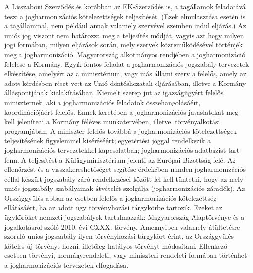 A Lisszaboni Szerződés és korábban az EK-Szerződés is, a tagállamok feladatává teszi a jogharmonizációs kötelezettségek teljesítését. (Ezek elmulasztása esetén is a tagállammal, nem például annak valamely szervével szemben indul eljárás.) Az uniós jog viszont nem határozza meg a teljesítés módját, vagyis azt hogy milyen jogi formában, milyen eljárások során, mely szervek közreműködésével történjék meg a jogharmonizáció. Magyarország alkotmányos rendjében a jogharmonizáció felelőse a Kormány. Egyik fontos feladat a jogharmonizációs jogszabály-tervezetek elkészítése, amelyért az a minisztérium, vagy más állami szerv a felelős, amely az adott kérdésben részt vett az Unió döntéshozatali eljárásában, illetve a Kormány álláspontjának kialakításában. Kiemelt szerep jut az igazságügyért felelős miniszternek, aki a jogharmonizációs feladatok összehangolásáért, koordinációjáért felelős. Ennek keretében a jogharmonizációs javaslatokat meg kell jeleníteni a Kormány féléves munkatervében, illetve. törvényalkotási programjában. A miniszter felelős továbbá a jogharmonizációs kötelezettségek teljesítésének figyelemmel kíséréséért; egyetértési joggal rendelkezik a jogharmonizációs tervezetekkel kapcsolatban; jogharmonizációs adatbázist tart fenn. A teljesítést a Külügyminisztérium jelenti az Európai Bizottság felé. Az ellenőrzést és a visszakereshetőséget segítése érdekében minden jogharmonizációs céllal készült jogszabály záró rendelkezései között fel kell tüntetni, hogy az mely uniós jogszabály szabályainak átvételét szolgálja (jogharmonizációs záradék). Az Országgyűlés abban az esetben felelős a jogharmonizációs kötelezettség ellátásáért, ha az adott ügy törvényhozási tárgykörbe tartozik. Ezeket az ügyköröket nemzeti jogszabályok tartalmazzák: Magyarország Alaptörvénye és a jogalkotásról szóló 2010. évi CXXX. törvény. Amennyiben valamely átültetésre szoruló uniós jogszabály ilyen törvényhozási tárgykört érint, az Országgyűlés köteles új törvényt hozni, illetőleg hatályos törvényt módosítani. Ellenkező esetben törvényi, kormányrendeleti, vagy miniszteri rendeleti formában történhet a jogharmonizációs tervezetek elfogadása. \cite{jogharmonizacio}